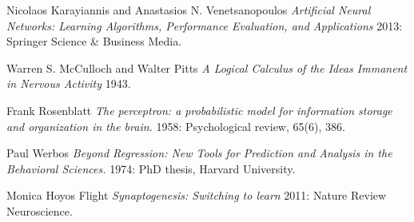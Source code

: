 \documentclass[letter]{article}
\begin{document}
\begin{thebibliography}{1}
     Nicolaos Karayiannis and Anastasios N. Venetsanopoulos {\em
    Artificial Neural Networks: Learning Algorithms, Performance Evaluation, and Applications} 2013: Springer Science
    & Business Media.

     Warren S. McCulloch and Walter Pitts {\em A Logical Calculus of the Ideas Immanent in Nervous Activity} 1943.

     Frank Rosenblatt {\em The perceptron: a probabilistic model for information storage and organization in the brain.}
    1958: Psychological review, 65(6), 386.

     Paul Werbos {\em Beyond Regression: New Tools for Prediction and Analysis in the Behavioral Sciences.} 1974: PhD thesis,
    Harvard University.

     Monica Hoyos Flight {\em Synaptogenesis: Switching to learn} 2011: Nature Review Neuroscience.

\end{thebibliography}
\end{document}
